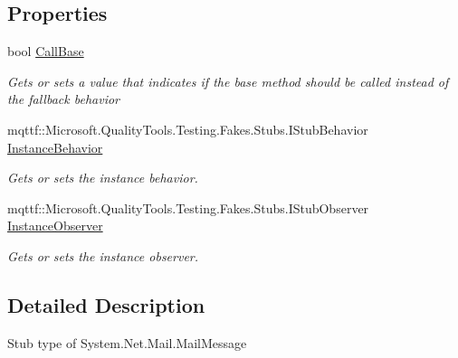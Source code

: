 \subsection*{Properties}
\begin{DoxyCompactItemize}
\item 
bool \hyperlink{class_system_1_1_net_1_1_mail_1_1_fakes_1_1_stub_mail_message_aed51c853ca1969d6421fcd46426c8fa9}{Call\-Base}
\begin{DoxyCompactList}\small\item\em Gets or sets a value that indicates if the base method should be called instead of the fallback behavior\end{DoxyCompactList}\item 
mqttf\-::\-Microsoft.\-Quality\-Tools.\-Testing.\-Fakes.\-Stubs.\-I\-Stub\-Behavior \hyperlink{class_system_1_1_net_1_1_mail_1_1_fakes_1_1_stub_mail_message_a9fb523211cacb38245cdd324b4e4508d}{Instance\-Behavior}
\begin{DoxyCompactList}\small\item\em Gets or sets the instance behavior.\end{DoxyCompactList}\item 
mqttf\-::\-Microsoft.\-Quality\-Tools.\-Testing.\-Fakes.\-Stubs.\-I\-Stub\-Observer \hyperlink{class_system_1_1_net_1_1_mail_1_1_fakes_1_1_stub_mail_message_a94688d0f03733c69912766325a25d509}{Instance\-Observer}
\begin{DoxyCompactList}\small\item\em Gets or sets the instance observer.\end{DoxyCompactList}\end{DoxyCompactItemize}


\subsection{Detailed Description}
Stub type of System.\-Net.\-Mail.\-Mail\-Message



